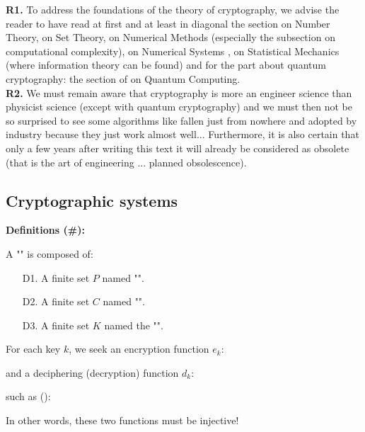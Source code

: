 	\begin{tcolorbox}[title=Remarks,colframe=black,arc=10pt]
	\textbf{R1.} To address the foundations of the theory of cryptography, we advise the reader to have read at first and at least in diagonal the section on Number Theory, on Set Theory, on Numerical Methods (especially the subsection on computational complexity), on Numerical Systems , on Statistical Mechanics (where information theory can be found) and for the part about quantum cryptography: the section of on Quantum Computing.\\
	
	\textbf{R2.} We must remain aware that cryptography is more an engineer science than physicist science (except with quantum cryptography) and we must then not be so surprised to see some algorithms like fallen just from nowhere and adopted by industry because they just work almost well... Furthermore, it is also certain that only a few years after writing this text it will already be considered as obsolete (that is the art of engineering ... planned obsolescence).
	\end{tcolorbox}
	
	\subsection{Cryptographic systems}
	
	\textbf{Definitions (\#\mydef):}
	
	A "" is composed of:
	\begin{enumerate}
		\item[D1.] A finite set $P$ named "".
		
		\item[D2.] A finite set $C$ named "".
		
		\item[D3.] A finite set $K$ named  the "".
	\end{enumerate}
	For each key $k$, we seek an encryption function $e_k$:
	
	and a deciphering (decryption) function $d_k$:
	
	such as ():
	
	In other words, these two functions must be injective!
	
